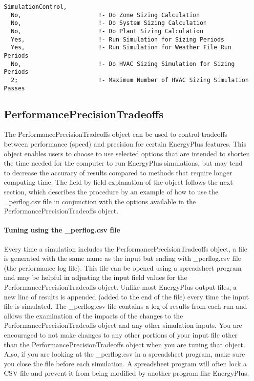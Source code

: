 \begin{lstlisting}
SimulationControl,
  No,                      !- Do Zone Sizing Calculation
  No,                      !- Do System Sizing Calculation
  No,                      !- Do Plant Sizing Calculation
  Yes,                     !- Run Simulation for Sizing Periods
  Yes,                     !- Run Simulation for Weather File Run Periods
  No,                      !- Do HVAC Sizing Simulation for Sizing Periods
  2;                       !- Maximum Number of HVAC Sizing Simulation Passes
\end{lstlisting}

\subsection{PerformancePrecisionTradeoffs}\label{performanceprecisiontradeoffs}

The PerformancePrecisionTradeoffs object can be used to control tradeoffs between performance (speed) and precision for certain EnergyPlus features. This object enables users to choose to use selected options that are intended to shorten the time needed for the computer to run EnergyPlus simulations, but may tend to decrease the accuracy of results compared to methods that require longer computing time. The field by field explanation of the object follows the next section, which describes the procedure by an example of how to use the \_perflog.csv file in conjunction with the options available in the PerformancePrecisionTradeoffs object.

\paragraph{Tuning using the \_perflog.csv file}\label{tuning-using-perlog-csv-file}

Every time a simulation includes the PerformancePrecisionTradeoffs object, a file is generated with the same name as the input but ending with \_perflog.csv file (the performance log file). This file can be opened using a spreadsheet program and may be helpful in adjusting the input field values for the PerformancePrecisionTradeoffs object. Unlike most EnergyPlus output files, a new line of results is appended (added to the end of the file) every time the input file is simulated. The \_perflog.csv file contains a log of results from each run and allows the examination of the impacts of the changes to the PerformancePrecisionTradeoffs object and any other simulation inputs. You are encouraged to not make changes to any other portions of your input file other than the PerformancePrecisionTradeoffs object when you are tuning that object. Also, if you are looking at the \_perflog.csv in a spreadsheet program, make sure you close the file before each simulation. A spreadsheet program will often lock a CSV file and prevent it from being modified by another program like EnergyPlus.

